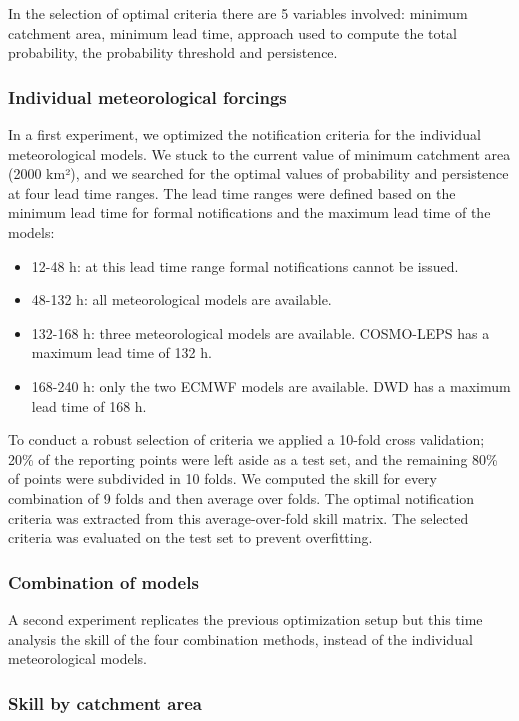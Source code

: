 \documentclass[preprint,12pt]{elsarticle}
\begin{document}
In the selection of optimal criteria there are 5 variables involved: minimum catchment area, minimum lead time, approach used to compute the total probability, the probability threshold and persistence.

\subsubsection{Individual meteorological forcings}

In a first experiment, we optimized the notification criteria for the individual meteorological models. We stuck to the current value of minimum catchment area (2000 km²), and we searched for the optimal values of probability and persistence at four lead time ranges. The lead time ranges were defined based on the minimum lead time for formal notifications and the maximum lead time of the models:

\begin{itemize}
    \item 12-48 h: at this lead time range formal notifications cannot be issued.
    \item 48-132 h: all meteorological models are available.
    \item 132-168 h: three meteorological models are available. COSMO-LEPS has a maximum lead time of 132 h.
    \item 168-240 h: only the two ECMWF models are available. DWD has a maximum lead time of 168 h.
\end{itemize}

To conduct a robust selection of criteria we applied a 10-fold cross validation; 20\% of the reporting points were left aside as a test set, and the remaining 80\% of points were subdivided in 10 folds. We computed the skill for every combination of 9 folds and then average over folds. The optimal notification criteria was extracted from this average-over-fold skill matrix. The selected criteria was evaluated on the test set to prevent overfitting.

\subsubsection{Combination of models}

A second experiment replicates the previous optimization setup but this time analysis the skill of the four combination methods, instead of the individual meteorological models.

\subsubsection{Skill by catchment area}
\end{document}
